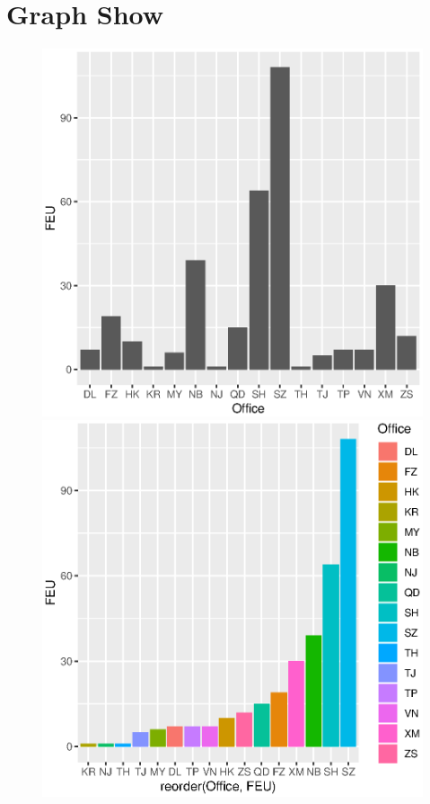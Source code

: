 \documentclass[a4paper]{book}
\begin{document}
	\section{Graph Show}
		\begin{figure}
		\begin{center}
		\includegraphics{Rplot01}
		\includegraphics{Rplot03}
		\end{center}
		\end{figure}
\end{document}
